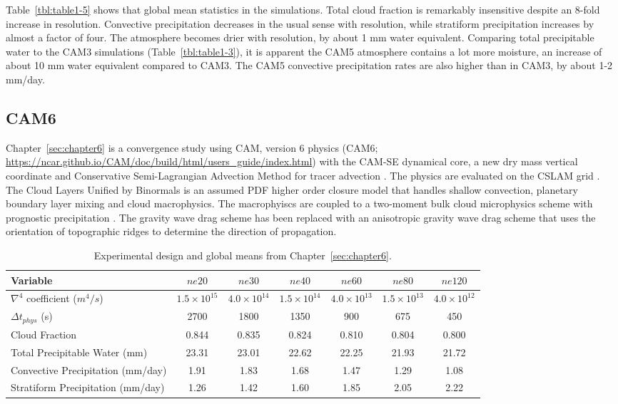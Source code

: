 Table~\ref{tbl:table1-5} shows that global mean statistics in the simulations. Total cloud fraction is remarkably insensitive despite an 8-fold increase in resolution. Convective precipitation decreases in the usual sense with resolution, while stratiform precipitation increases by almost a factor of four. The atmosphere becomes drier with resolution, by about 1 mm water equivalent. Comparing total precipitable water to the CAM3 simulations (Table~\ref{tbl:table1-3}), it is apparent the CAM5 atmosphere contains a lot more moisture, an increase of about 10 mm water equivalent compared to CAM3. The CAM5 convective precipitation rates are also higher than in CAM3, by about 1-2 mm/day.

\subsection{CAM6}

Chapter~\ref{sec:chapter6} is a convergence study using CAM, version 6 physics (CAM6; \url{https://ncar.github.io/CAM/doc/build/html/users_guide/index.html}) with the CAM-SE dynamical core, a new dry mass vertical coordinate \citep{LetAl2018JAMES} and Conservative Semi-Lagrangian Advection Method for tracer advection \citep[CSLAM; ][]{LTOUNGK2017MWR}. The physics are evaluated on the CSLAM grid \citep{HL2018MWR}. The Cloud Layers Unified by Binormals \citep[CLUBB][]{GETAL2002JAS,BOG2013JCLIM} is an assumed PDF higher order closure model that handles shallow convection, planetary boundary layer mixing and cloud macrophysics. The macrophyiscs are coupled to a two-moment bulk cloud microphysics scheme with prognostic precipitation \citep{MG2}. The gravity wave drag scheme has been replaced with an anisotropic gravity wave drag scheme that uses the orientation of topographic ridges to determine the direction of propagation.

 \begin{table}
 \caption{Experimental design and global means from Chapter~\ref{sec:chapter6}.}
 \centering
 \scriptsize
 \begin{tabular}{lcccccc}
 \hline
 Variable & $ne20$ & $ne30$ & $ne40$ & $ne60$ & $ne80$ & $ne120$ \\
   \hline
   $\nabla^{4}$ coefficient ($m^4/s$) & $1.5 \times 10^{15}$ & $4.0 \times 10^{14}$ & $1.5 \times 10^{14}$ & $4.0 \times 10^{13}$  & $1.5 \times 10^{13}$ & $4.0 \times 10^{12}$\\
    $\Delta t_{phys}$ (s) & 2700 & 1800 & 1350 & 900 & 675 & 450 \\
   Cloud Fraction & 0.844 & 0.835 & 0.824 & 0.810 & 0.804 & 0.800 \\ 
   Total Precipitable Water (mm) & 23.31& 23.01 & 22.62 & 22.25 & 21.93 & 21.72 \\
   Convective Precipitation (mm/day) & 1.91 & 1.83 & 1.68 & 1.47 & 1.29 & 1.08 \\
   Stratiform Precipitation (mm/day) & 1.26 & 1.42 & 1.60 & 1.85 & 2.05 & 2.22 \\      
 \hline
 \end{tabular}
 \label{tbl:table1-6}
 \end{table}

